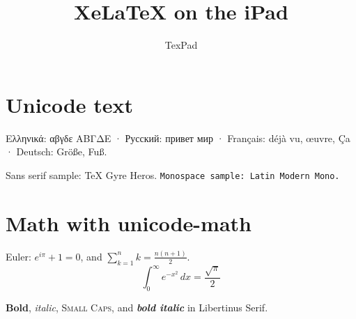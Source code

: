 \documentclass[11pt]{article}
\title{XeLaTeX on the iPad}
\author{TexPad}
\begin{document}
\maketitle

\section{Unicode text}
Ελληνικά: αβγδε ΑΒΓΔΕ · Русский: привет мир · Français: déjà vu, œuvre, Ça · Deutsch: Größe, Fuß.

{\sffamily Sans serif sample: TeX Gyre Heros.} \texttt{Monospace sample: Latin Modern Mono.}

\section{Math with unicode-math}
Euler: $e^{iπ} + 1 = 0$, and $\displaystyle ∑_{k=1}^{n} k = \frac{n(n+1)}{2}$.
\[ ∫_0^∞ e^{-x^2}\,dx = \frac{\sqrt{π}}{2} \]

\textbf{Bold}, \textit{italic}, \textsc{Small Caps}, and \textbf{\textit{bold italic}} in Libertinus Serif.
\end{document}
